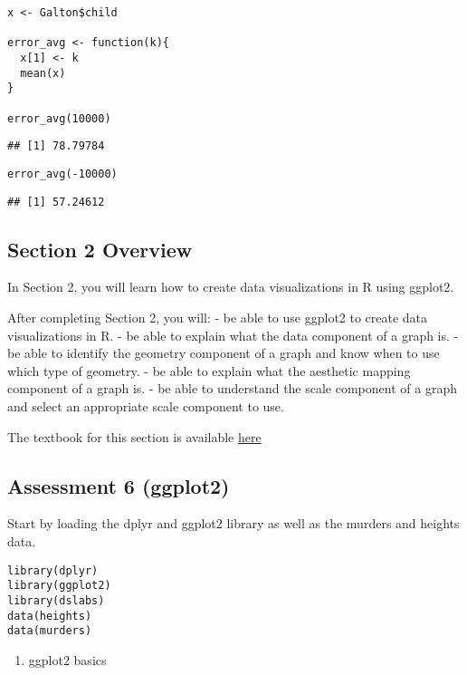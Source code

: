 \documentclass[]{article}
\providecommand{\tightlist}{%
  \setlength{\itemsep}{0pt}\setlength{\parskip}{0pt}}
\begin{document}
\begin{verbatim}
x <- Galton$child

error_avg <- function(k){
  x[1] <- k
  mean(x)
}

error_avg(10000)
\end{verbatim}

\begin{verbatim}
## [1] 78.79784
\end{verbatim}

\begin{verbatim}
error_avg(-10000)
\end{verbatim}

\begin{verbatim}
## [1] 57.24612
\end{verbatim}

\hypertarget{section-2-overview}{%
\subsection{Section 2 Overview}\label{section-2-overview}}

In Section 2, you will learn how to create data visualizations in R
using ggplot2.

After completing Section 2, you will: - be able to use ggplot2 to create
data visualizations in R. - be able to explain what the data component
of a graph is. - be able to identify the geometry component of a graph
and know when to use which type of geometry. - be able to explain what
the aesthetic mapping component of a graph is. - be able to understand
the scale component of a graph and select an appropriate scale component
to use.

The textbook for this section is available
\href{https://rafalab.github.io/dsbook/ggplot2.html}{here}

\hypertarget{assessment-6-ggplot2}{%
\subsection{Assessment 6 (ggplot2)}\label{assessment-6-ggplot2}}

Start by loading the dplyr and ggplot2 library as well as the murders
and heights data.

\begin{verbatim}
library(dplyr)
library(ggplot2)
library(dslabs)
data(heights)
data(murders)
\end{verbatim}

\begin{enumerate}
\def\labelenumi{\arabic{enumi}.}
\tightlist
\item
  ggplot2 basics
\end{enumerate}
\end{document}
